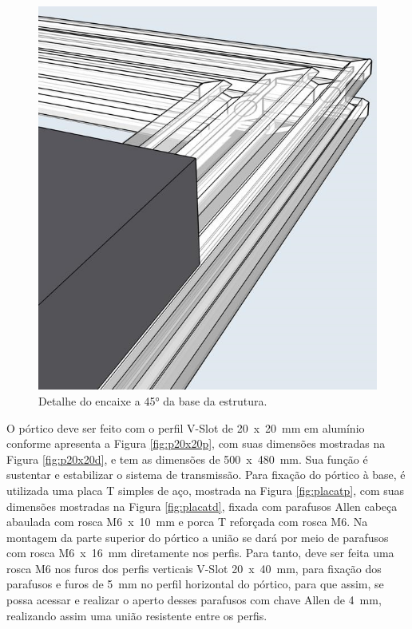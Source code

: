 \begin{figure}[H]
\centering
\caption{Detalhe do encaixe a 45° da base da estrutura.}\label{fig:detalhe45}
\includegraphics[scale = 0.7]{figuras/detalhe45}
\end{figure}
    
O pórtico deve ser feito com o perfil V-Slot de 20~x~20~mm em alumínio conforme apresenta 
a Figura \ref{fig:p20x20p}, com suas dimensões mostradas na Figura \ref{fig:p20x20d}, 
e tem as dimensões de 500~x~480~mm. Sua função é sustentar 
e estabilizar o sistema de transmissão. Para fixação do pórtico à base, é utilizada 
uma placa T simples de aço, mostrada na Figura \ref{fig:placatp}, com suas dimensões mostradas na 
Figura \ref{fig:placatd}, fixada com parafusos Allen cabeça abaulada com rosca M6~x~10~mm 
e porca T reforçada com rosca M6. Na montagem da parte superior do pórtico a união 
se dará por meio de parafusos com rosca M6~x~16~mm diretamente nos perfis. 
Para tanto, deve ser feita uma rosca M6 nos furos dos perfis verticais V-Slot 20~x~40~mm, para 
fixação dos parafusos e furos de 5~mm no perfil horizontal do pórtico, para que assim, se possa acessar 
e realizar o aperto desses parafusos com chave Allen de 4~mm, realizando assim uma união 
resistente entre os perfis.

